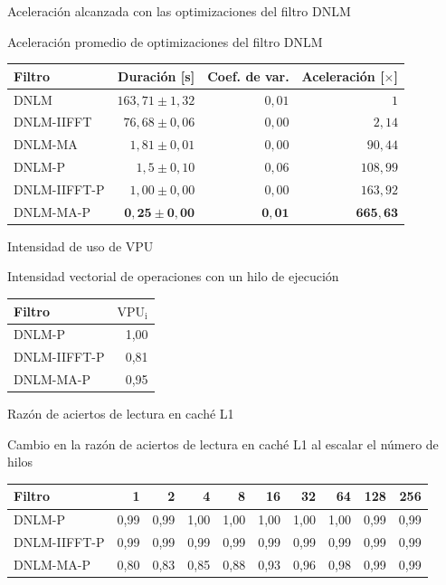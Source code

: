 \documentclass[15pt]{beamer} %
\begin{document}
\begin{frame}{Aceleraci\'on alcanzada con las optimizaciones del filtro DNLM}
  


  \begin{center}
    {\footnotesize Aceleración promedio de optimizaciones del filtro DNLM}
    \begin{tabular}{lrrr}
	Filtro & Duración [s]& Coef. de var. & Aceleración [$\times$]\tabularnewline
	\hline
	DNLM & $163,71\pm1,32$ & $0,01$ & $1$\tabularnewline
	DNLM-IIFFT & $76,68\pm0,06$ & $0,00$ & $2,14$\tabularnewline
	DNLM-MA & $1,81\pm 0,01$ & $0,00$ & $90,44$ \tabularnewline
	DNLM-P & $1,5\pm0,10$ & $0,06$ & $108,99$\tabularnewline
	DNLM-IIFFT-P & $1,00\pm0,00$ & $0,00$ & $163,92$ \tabularnewline 
	DNLM-MA-P & $\boldsymbol{0,25\pm0,00}$ & $\boldsymbol{0,01}$ &  $\boldsymbol{665,63}$\tabularnewline
	\end{tabular}
  \end{center}
\end{frame}


\begin{frame}{Intensidad de uso de VPU}
  
  \begin{center}
    {\footnotesize Intensidad vectorial de operaciones con un hilo de ejecución}
    \begin{tabular}{lr}
	 Filtro & $\text{VPU}_{\text{i}}$ \tabularnewline
	\hline
	DNLM-P & 1,00 \tabularnewline
	DNLM-IIFFT-P & 0,81 \tabularnewline
	DNLM-MA-P & 0,95 \tabularnewline
	\end{tabular}
  \end{center}
\end{frame}

\begin{frame}{Raz\'on de aciertos de lectura en cach\'e L1}
  
  \begin{center}
  \setlength\tabcolsep{2.5pt}
   \setlength{\textfloatsep}{25mm}
    {\footnotesize Cambio en la raz\'on de aciertos de lectura en cach\'e L1 al escalar el n\'umero de hilos}
    \begin{tabular}{lrrrrrrrrr}
	 Filtro & 1 & 2 & 4 & 8 & 16 & 32 & 64 & 128 & 256 \tabularnewline
	\hline
	DNLM-P & 0,99 & 0,99 & 1,00 & 1,00 & 1,00 & 1,00 & 1,00 & 0,99 & 0,99 \tabularnewline
	DNLM-IIFFT-P & 0,99 & 0,99 & 0,99 & 0,99 & 0,99 & 0,99 & 0,99 & 0,99 & 0,99 \tabularnewline
	DNLM-MA-P & 0,80 & 0,83 & 0,85 & 0,88 & 0,93 & 0,96 & 0,98 & 0,99 & 0,99 \tabularnewline
	\end{tabular}
  \end{center}
\end{frame}
\end{document}
